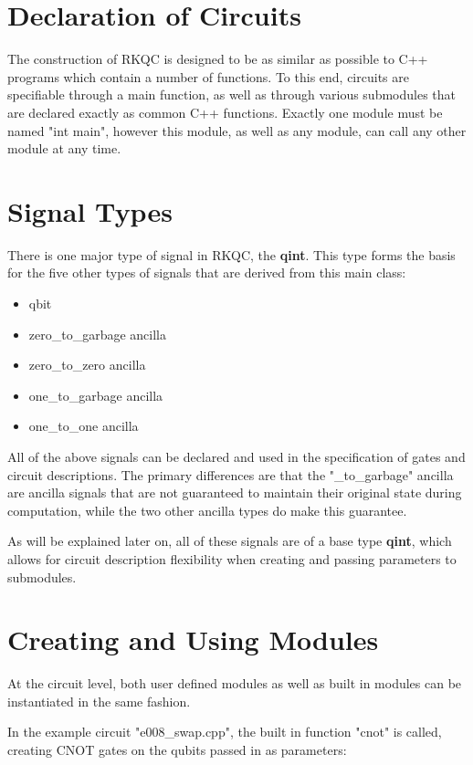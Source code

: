 \section{Declaration of Circuits}

The construction of RKQC is designed to be as similar as possible to C++ programs which contain a number of functions. To this end, circuits are specifiable through a main function, as well as through various submodules that are declared exactly as common C++ functions. Exactly one module must be named "int main", however this module, as well as any module, can call any other module at any time.

\section{Signal Types}

There is one major type of signal in RKQC, the \textbf{qint}. This type forms the basis for the five other types of signals that are derived from this main class:

\begin{itemize}
    \item qbit
    \item zero\_to\_garbage ancilla
    \item zero\_to\_zero ancilla
    \item one\_to\_garbage ancilla
    \item one\_to\_one ancilla
\end{itemize}

All of the above signals can be declared and used in the specification of gates and circuit descriptions. The primary differences are that the "\_to\_garbage" ancilla are ancilla signals that are not guaranteed to maintain their original state during computation, while the two other ancilla types do make this guarantee.

As will be explained later on, all of these signals are of a base type \textbf{qint}, which allows for circuit description flexibility when creating and passing parameters to submodules.

\section{Creating and Using Modules}

At the circuit level, both user defined modules as well as built in modules can be instantiated in the same fashion. 

In the example circuit "e008\_swap.cpp", the built in function "cnot" is called, creating CNOT gates on the qubits passed in as parameters:

